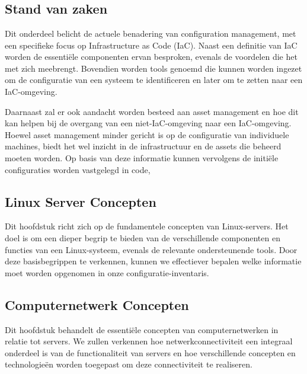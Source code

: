 
\chapter{}%
\label{ch:methodologie}

\section{Stand van zaken}
\label{sec:stand-van-zaken}
Dit onderdeel belicht de actuele benadering van configuration management, met een specifieke focus op Infrastructure as Code (IaC).
Naast een definitie van IaC worden de essenti\"ele componenten ervan besproken, evenals de voordelen die het met zich meebrengt.
Bovendien worden tools genoemd die kunnen worden ingezet om de configuratie van een systeem te identificeren en later om te zetten naar een IaC-omgeving.

Daarnaast zal er ook aandacht worden besteed aan asset management en hoe dit kan helpen bij de overgang van een niet-IaC-omgeving naar een IaC-omgeving.
Hoewel asset management minder gericht is op de configuratie van individuele machines, biedt het wel inzicht in de infrastructuur en de assets die beheerd moeten worden.
Op basis van deze informatie kunnen vervolgens de initi\"ele configuraties worden vastgelegd in code,

\section{Linux Server Concepten}
\label{sec:linux-server-concepten}
Dit hoofdstuk richt zich op de fundamentele concepten van Linux-servers.
Het doel is om een dieper begrip te bieden van de verschillende componenten en functies van een Linux-systeem, evenals de relevante ondersteunende tools.
Door deze basisbegrippen te verkennen, kunnen we effectiever bepalen welke informatie moet worden opgenomen in onze configuratie-inventaris.

\section{Computernetwerk Concepten}
\label{sec:computernetwerk-concepten}
Dit hoofdstuk behandelt de essenti\"ele concepten van computernetwerken in relatie tot servers.
We zullen verkennen hoe netwerkconnectiviteit een integraal onderdeel is van de functionaliteit van servers en hoe verschillende concepten en technologie\"en worden toegepast om deze connectiviteit te realiseren.

